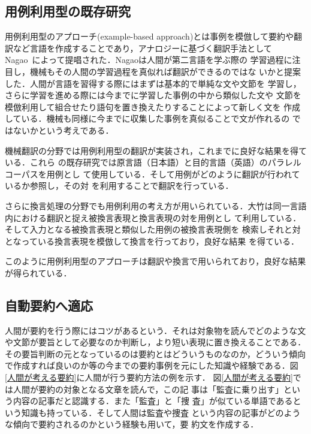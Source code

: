 \documentclass[japanese]{jnlp_1.4}
\begin{document}
\subsection{用例利用型の既存研究}

用例利用型のアプローチ(example-based approach)とは事例を模倣して要約や翻
訳など言語を作成することであり，アナロジーに基づく翻訳手法として
Nagao~\cite{Nagao:1984}によって提唱された．Nagaoは人間が第二言語を学ぶ際の
学習過程に注目し，機械もその人間の学習過程を真似れば翻訳ができるのではな
いかと提案した．人間が言語を習得する際にはまずは基本的で単純な文や文節を
学習し，さらに学習を進める際には今までに学習した事例の中から類似した文や
文節を模倣利用して組合せたり語句を置き換えたりすることによって新しく文を
作成している．機械も同様に今までに収集した事例を真似ることで文が作れるの
ではないかという考えである．


機械翻訳の分野では用例利用型の翻訳が実装され，これまでに良好な結果を得て
いる．これら
の既存研究では原言語（日本語）と目的言語（英語）のパラレルコーパスを用例とし
て使用している．そして用例がどのように翻訳が行われているか参照し，その対
を利用することで翻訳を行っている．

さらに換言処理の分野でも用例利用の考え方が用いられている．大竹\cite{大竹清敬:
2003NLP}は同一言語内における翻訳と捉え被換言表現と換言表現の対を用例とし
て利用している．そして入力となる被換言表現と類似した用例の被換言表現側を
検索しそれと対となっている換言表現を模倣して換言を行っており，良好な結果
を得ている．

このように用例利用型のアプローチは翻訳や換言で用いられており，良好な結果
が得られている．

\subsection{自動要約へ適応}\label{節:自動要約へ適応}

人間が要約を行う際にはコツがあるという．それは対象物を読んでどのような文
や文節が要旨として必要なのか判断し，より短い表現に置き換えることである．
その要旨判断の元となっているのは要約とはどういうものなのか，どういう傾向
で作成すれば良いのか等の今までの要約事例を元にした知識や経験である．図
\ref{人間が考える要約}に人間が行う要約方法の例を示す．
図\ref{人間が考える要約}では人間が要約の対象となる文章を読んで，この記
事は「監査に乗り出す」という内容の記事だと認識する．また「監査」と「捜
査」が似ている単語であるという知識も持っている．そして人間は監査や捜査
という内容の記事がどのような傾向で要約されるのかという経験も用いて，要
約文を作成する．
\end{document}
